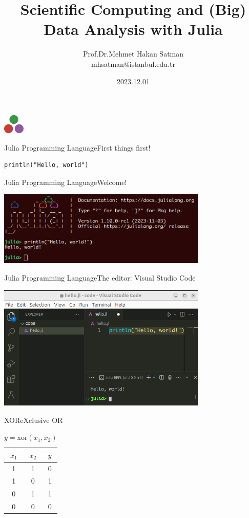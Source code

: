 \documentclass[11pt]{beamer}
\author{Prof.Dr.Mehmet Hakan Satman \\ mhsatman@istanbul.edu.tr}
\title{Scientific Computing and (Big) Data Analysis with Julia}
\institute{Istanbul University}
\date{2023.12.01}
\begin{document}
\begin{frame}
\includegraphics[width=1cm]{images/julia.png}
\titlepage
\end{frame}


\begin{frame}[fragile]{Julia Programming Language}{First things first!}
\begin{lstlisting}
println("Hello, world")
\end{lstlisting}
\end{frame}


\begin{frame}[fragile]{Julia Programming Language}{Welcome!}
	\begin{center}
			\includegraphics[width=10cm]{images/welcome.png}
	\end{center}
\end{frame}


\begin{frame}[fragile]{Julia Programming Language}{The editor: Visual Studio Code}
	\begin{center}
		\includegraphics[width=10cm]{images/vscode.png}
	\end{center}
\end{frame}


\begin{frame}[fragile]{XOR}{eXclusive OR}
\begin{table}
\centering
\begin{tabular}{|c|c|c|}
	\hline
	$x_1$ & $x_2$ & $y$ \\
	\hline 
	1 & 1 & 0 \\
	\hline 
	1 & 0 & 1 \\
	\hline 
	0 & 1 & 1 \\
	\hline 
	0 & 0 & 0 \\
	\hline 
\end{tabular}
\caption{$y = \text{xor}(x_1, x_2)$}
\end{table}
\end{frame}
\end{document}
